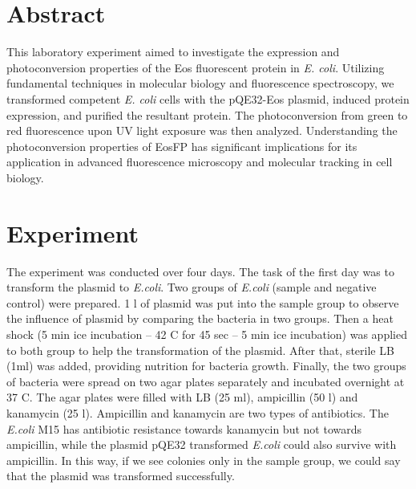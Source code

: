 \documentclass[a4paper,english,12pt,bibliography=totoc]{scrreprt}
\begin{document}


\chapter{Abstract}
\label{cha:Abstract & Aim}


This laboratory experiment aimed to investigate the expression and photoconversion properties of the Eos fluorescent protein in \textit{E. coli}. Utilizing fundamental techniques in molecular biology and fluorescence spectroscopy, we transformed competent \textit{E. coli} cells with the pQE32-Eos plasmid, induced protein expression, and purified the resultant protein. The photoconversion from green to red fluorescence upon UV light exposure was then analyzed. Understanding the photoconversion properties of EosFP has significant implications for its application in advanced fluorescence microscopy and molecular tracking in cell biology.

  

\chapter{Experiment}
\label{cha:Experiment}

The experiment was conducted over four days. The task of the first day was to transform the plasmid to \textit{E.coli}. Two groups of \textit{E.coli} (sample and negative control) were prepared. 1 \textmu l of plasmid was put into the sample group to observe the influence of plasmid by comparing the bacteria in two groups. Then a heat shock (5 min ice incubation -- 42 \textdegree C for 45 sec -- 5 min ice incubation) was applied to both group to help the transformation of the plasmid. After that, sterile LB (1ml) was added, providing nutrition for bacteria growth. Finally, the two groups of bacteria were spread on two agar plates separately and incubated overnight at 37 \textdegree C. The agar plates were filled with LB (25 ml), ampicillin (50 \textmu l) and kanamycin (25 \textmu l). Ampicillin and kanamycin are two types of antibiotics. The \textit{E.coli} M15 has antibiotic resistance towards kanamycin but not towards ampicillin, while the plasmid pQE32 transformed \textit{E.coli} could also survive with ampicillin. In this way, if we see colonies only in the sample group, we could say that the plasmid was transformed successfully.\\
\end{document}
